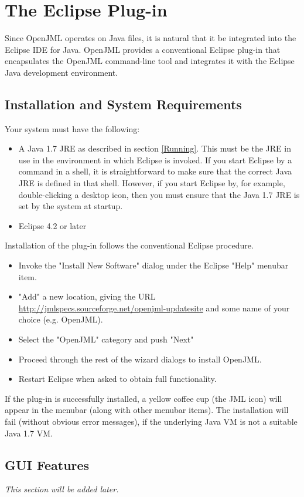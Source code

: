 \chapter{The Eclipse Plug-in}
\label{EclipsePlugin}

Since OpenJML operates on Java files, it is natural that it be integrated into the Eclipse IDE for Java.
OpenJML provides a conventional Eclipse plug-in that encapsulates the OpenJML command-line tool and integrates it
with the Eclipse Java development environment.

\section{Installation and System Requirements}
Your system must have the following:
\begin{itemize}
\item A Java 1.7 JRE as described in section \ref{Running}. This must be the JRE in use in the environment in which Eclipse is invoked. If you start Eclipse by a command in a shell, it is straightforward to make sure that the correct Java JRE is defined in that shell.  However, if you start Eclipse by, for example, double-clicking a desktop icon, then you must ensure that the Java 1.7 JRE is set by the system at startup.
\item Eclipse 4.2 or later
\end{itemize}

Installation of the plug-in follows the conventional Eclipse procedure.
\begin{itemize}
\item Invoke the "Install New Software" dialog under the Eclipse "Help" menubar item.
\item "Add" a new location, giving the URL \url{http://jmlspecs.sourceforge.net/openjml-updatesite} and some name of your choice (e.g. OpenJML).
\item Select the "OpenJML" category and push "Next"
\item Proceed through the rest of the wizard dialogs to install OpenJML.
\item Restart Eclipse when asked to obtain full functionality.
\end{itemize}

If the plug-in is successfully installed, a yellow coffee cup (the JML icon) will appear in the menubar (along with other menubar items).
The installation will fail (without obvious error messages), if the underlying Java VM is not a suitable Java 1.7 VM.

\section{GUI Features}

\textit{This section will be added later.} %
